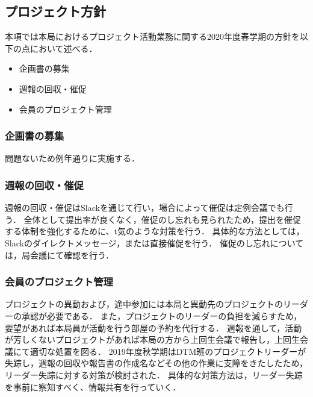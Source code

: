 ﻿\subsection*{プロジェクト方針}


本項では本局におけるプロジェクト活動業務に関する2020年度春学期の方針を以下の点において述べる．

\begin{itemize}
\item 企画書の募集
\item 週報の回収・催促
\item 会員のプロジェクト管理
\end{itemize}

\subsubsection*{企画書の募集}
問題ないため例年通りに実施する．

\subsubsection*{週報の回収・催促}

週報の回収・催促はSlackを通じて行い，場合によって催促は定例会議でも行う．
全体として提出率が良くなく，催促のし忘れも見られたため，提出を催促する体制を強化するために、t気のような対策を行う．
具体的な方法としては，Slackのダイレクトメッセージ，または直接催促を行う．
催促のし忘れについては，局会議にて確認を行う．

\subsubsection*{会員のプロジェクト管理}

プロジェクトの異動および，途中参加には本局と異動先のプロジェクトのリーダーの承認が必要である．
また，プロジェクトのリーダーの負担を減らすため，要望があれば本局員が活動を行う部屋の予約を代行する．
週報を通して，活動が芳しくないプロジェクトがあれば本局の方から上回生会議で報告し，上回生会議にて適切な処置を図る．
2019年度秋学期はDTM班のプロジェクトリーダーが失踪し，週報の回収や報告書の作成名などその他の作業に支障をきたしたため，リーダー失踪に対する対策が検討された．
具体的な対策方法は，リーダー失踪を事前に察知すべく、情報共有を行っていく．
